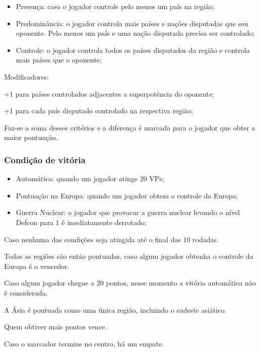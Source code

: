 \documentclass[11pt]{article}
\begin{document}
\begin{itemize}
\item Presença: caso o jogador controle pelo menos um país na região;

\item Predominância: o jogador controla mais países e nações disputadas que seu oponente. Pelo menos um país e uma nação disputada precisa ser controlado;

\item Controle: o jogador controla todos os países disputados da região e controla mais países que o oponente;
\end{itemize}

Modificadores:

+1 para países controlados adjacentes a superpotência do oponente;

+1 para cada país disputado controlado na respectiva região;

Faz-se a soma desses critérios e a diferença é marcada para o jogador que obter a maior pontuação.

\subsubsection{Condição de vitória}
\label{sec:org2271a7c}

\begin{itemize}
\item Automática: quando um jogador atinge 20 VPs;

\item Pontuação na Europa: quando um jogador obtem o controle da Europa;

\item Guerra Nuclear: o jogador que provocar a guerra nuclear levando o nível Defcon para 1 é imediatamente derrotado;
\end{itemize}


Caso nenhuma das condições seja atingida até o final das 10 rodadas.

Todas as regiões são então pontuadas, caso algum jogador obtenha o controle da Europa é o vencedor.

Caso algum jogador chegue a 20 pontos, nesse momento a vitória automática não é considerada.

A Ásia é pontuada como uma única região, incluindo o sudeste asiático.

Quem obtiver mais pontos vence.

Caso o marcador termine no centro, há um empate.
\end{document}

